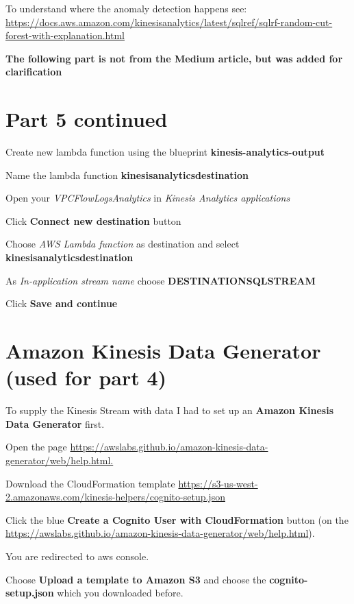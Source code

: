 To understand where the anomaly detection happens see:\\ \scriptsize{\url{https://docs.aws.amazon.com/kinesisanalytics/latest/sqlref/sqlrf-random-cut-forest-with-explanation.html}}

\textbf{The following part is not from the Medium article, but was added for clarification}


\section{Part 5 continued}

Create new lambda function using the blueprint \textbf{kinesis-analytics-output}

Name the lambda function \textbf{kinesis\textunderscore analytics\textunderscore destination}

Open your \textit{VPCFlowLogsAnalytics} in \textit{Kinesis Analytics applications}

Click \textbf{Connect new destination} button

Choose \textit{AWS Lambda function} as destination and select \textbf{kinesis\textunderscore analytics\textunderscore destination}

As \textit{In-application stream name} choose \textbf{DESTINATION\textunderscore SQL\textunderscore STREAM}

Click \textbf{Save and continue}

\section{Amazon Kinesis Data Generator (used for part 4)}
To supply the Kinesis Stream with data I had to set up an \textbf{Amazon Kinesis Data Generator} first.

Open the page \scriptsize{\url{https://awslabs.github.io/amazon-kinesis-data-generator/web/help.html.}}

Download the CloudFormation template \scriptsize{\url{https://s3-us-west-2.amazonaws.com/kinesis-helpers/cognito-setup.json}}


Click the blue \textbf{Create a Cognito User with CloudFormation} button (on the \scriptsize{\url{https://awslabs.github.io/amazon-kinesis-data-generator/web/help.html}}).

You are redirected to aws console. 

Choose \textbf{Upload a template to Amazon S3} and choose the \textbf{cognito-setup.json} which you downloaded before.


